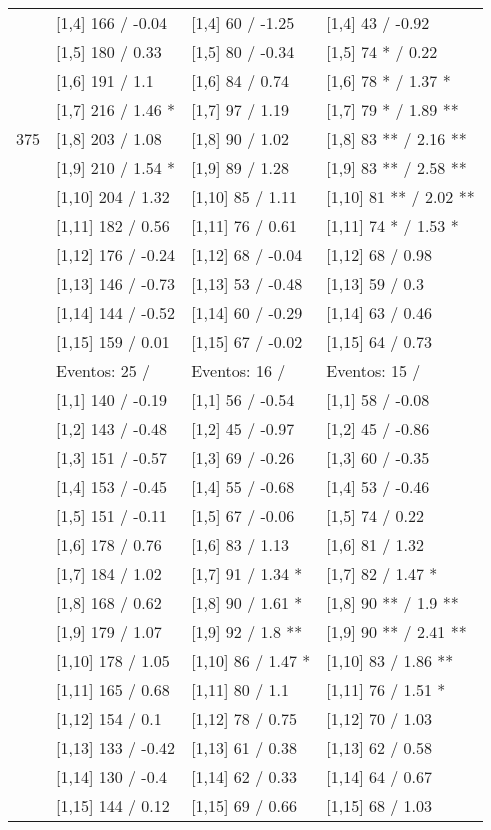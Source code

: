 \begin{table}
\begin{tabular}[t]{llll}
\addlinespace
 & {}[1,4] 166  / -0.04 & {}[1,4] 60  / -1.25 & {}[1,4] 43  / -0.92\\
 & {}[1,5] 180  / 0.33 & {}[1,5] 80  / -0.34 & {}[1,5] 74 * / 0.22\\
 & {}[1,6] 191  / 1.1 & {}[1,6] 84  / 0.74 & {}[1,6] 78 * / 1.37 *\\
 & {}[1,7] 216  / 1.46 * & {}[1,7] 97  / 1.19 & {}[1,7] 79 * / 1.89 **\\
375 & {}[1,8] 203  / 1.08 & {}[1,8] 90  / 1.02 & {}[1,8] 83 ** / 2.16 **\\
\addlinespace
 & {}[1,9] 210  / 1.54 * & {}[1,9] 89  / 1.28 & {}[1,9] 83 ** / 2.58 **\\
 & {}[1,10] 204  / 1.32 & {}[1,10] 85  / 1.11 & {}[1,10] 81 ** / 2.02 **\\
 & {}[1,11] 182  / 0.56 & {}[1,11] 76  / 0.61 & {}[1,11] 74 * / 1.53 *\\
 & {}[1,12] 176  / -0.24 & {}[1,12] 68  / -0.04 & {}[1,12] 68  / 0.98\\
 & {}[1,13] 146  / -0.73 & {}[1,13] 53  / -0.48 & {}[1,13] 59  / 0.3\\
\addlinespace
 & {}[1,14] 144  / -0.52 & {}[1,14] 60  / -0.29 & {}[1,14] 63  / 0.46\\
 & {}[1,15] 159  / 0.01 & {}[1,15] 67  / -0.02 & {}[1,15] 64  / 0.73\\
 & Eventos:  25 / & Eventos:  16 / & Eventos:  15 /\\
 & {}[1,1] 140  / -0.19 & {}[1,1] 56  / -0.54 & {}[1,1] 58  / -0.08\\
 & {}[1,2] 143  / -0.48 & {}[1,2] 45  / -0.97 & {}[1,2] 45  / -0.86\\
\addlinespace
 & {}[1,3] 151  / -0.57 & {}[1,3] 69  / -0.26 & {}[1,3] 60  / -0.35\\
 & {}[1,4] 153  / -0.45 & {}[1,4] 55  / -0.68 & {}[1,4] 53  / -0.46\\
 & {}[1,5] 151  / -0.11 & {}[1,5] 67  / -0.06 & {}[1,5] 74  / 0.22\\
 & {}[1,6] 178  / 0.76 & {}[1,6] 83  / 1.13 & {}[1,6] 81  / 1.32\\
 & {}[1,7] 184  / 1.02 & {}[1,7] 91  / 1.34 * & {}[1,7] 82  / 1.47 *\\
\addlinespace
500 & {}[1,8] 168  / 0.62 & {}[1,8] 90  / 1.61 * & {}[1,8] 90 ** / 1.9 **\\
 & {}[1,9] 179  / 1.07 & {}[1,9] 92  / 1.8 ** & {}[1,9] 90 ** / 2.41 **\\
 & {}[1,10] 178  / 1.05 & {}[1,10] 86  / 1.47 * & {}[1,10] 83  / 1.86 **\\
 & {}[1,11] 165  / 0.68 & {}[1,11] 80  / 1.1 & {}[1,11] 76  / 1.51 *\\
 & {}[1,12] 154  / 0.1 & {}[1,12] 78  / 0.75 & {}[1,12] 70  / 1.03\\
\addlinespace
 & {}[1,13] 133  / -0.42 & {}[1,13] 61  / 0.38 & {}[1,13] 62  / 0.58\\
 & {}[1,14] 130  / -0.4 & {}[1,14] 62  / 0.33 & {}[1,14] 64  / 0.67\\
 & {}[1,15] 144  / 0.12 & {}[1,15] 69  / 0.66 & {}[1,15] 68  / 1.03\\
\bottomrule
\end{tabular}
\end{table}
